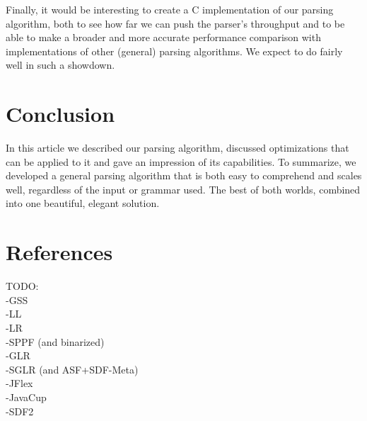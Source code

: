 \documentclass[a4paper,10pt]{article}
\begin{document}
Finally, it would be interesting to create a C implementation of our parsing algorithm, both to see how far we can push the parser's throughput and to be able to make a broader and more accurate performance comparison with implementations of other (general) parsing algorithms. We expect to do fairly well in such a showdown.

\section{Conclusion}

In this article we described our parsing algorithm, discussed optimizations that can be applied to it and gave an impression of its capabilities. To summarize, we developed a general parsing algorithm that is both easy to comprehend and scales well, regardless of the input or grammar used. The best of both worlds, combined into one beautiful, elegant solution.

\section{References}

TODO:\\
-GSS\\
-LL\\
-LR\\
-SPPF (and binarized)\\
-GLR\\
-SGLR (and ASF+SDF-Meta)\\
-JFlex\\
-JavaCup\\
-SDF2
\end{document}
